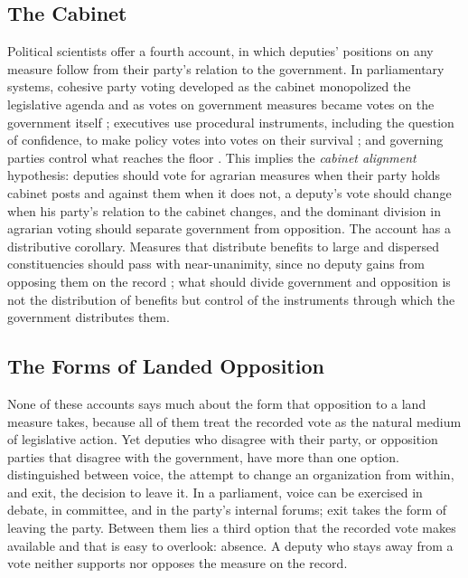 \documentclass[12pt]{article}
\begin{document}
\subsection*{The Cabinet}

Political scientists offer a fourth account, in which deputies' positions on any measure follow from their party's relation to the government. In parliamentary systems, cohesive party voting developed as the cabinet monopolized the legislative agenda and as votes on government measures became votes on the government itself \citep{cox1987}; executives use procedural instruments, including the question of confidence, to make policy votes into votes on their survival \citep{huber1996}; and governing parties control what reaches the floor \citep{cox2005}. This implies the \textit{cabinet alignment} hypothesis: deputies should vote for agrarian measures when their party holds cabinet posts and against them when it does not, a deputy's vote should change when his party's relation to the cabinet changes, and the dominant division in agrarian voting should separate government from opposition. The account has a distributive corollary. Measures that distribute benefits to large and dispersed constituencies should pass with near-unanimity, since no deputy gains from opposing them on the record \citep{weingast1979}; what should divide government and opposition is not the distribution of benefits but control of the instruments through which the government distributes them.

\subsection*{The Forms of Landed Opposition}

None of these accounts says much about the form that opposition to a land measure takes, because all of them treat the recorded vote as the natural medium of legislative action. Yet deputies who disagree with their party, or opposition parties that disagree with the government, have more than one option. \citet{hirschman1970} distinguished between voice, the attempt to change an organization from within, and exit, the decision to leave it. In a parliament, voice can be exercised in debate, in committee, and in the party's internal forums; exit takes the form of leaving the party. Between them lies a third option that the recorded vote makes available and that is easy to overlook: absence. A deputy who stays away from a vote neither supports nor opposes the measure on the record.
\end{document}
